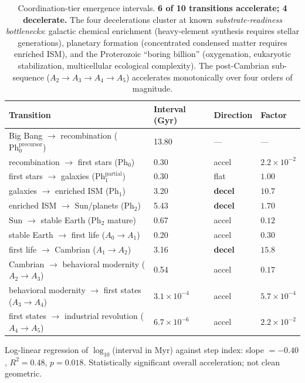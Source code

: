 \documentclass[11pt,a4paper]{article}
\newcommand{\Phys}{\mathrm{Ph}}
\begin{document}
\begin{table}[h]
\centering
\small
\begin{tabular}{p{4.8cm}p{2.0cm}p{1.5cm}p{1.5cm}}
\toprule
\textbf{Transition} & \textbf{Interval (Gyr)} & \textbf{Direction} & \textbf{Factor} \\
\midrule
Big Bang $\to$ recombination ($\Phys_0^{\text{precursor}}$) & 13.80 & --- & --- \\
recombination $\to$ first stars ($\Phys_0$) & 0.30 & accel & $2.2 \times 10^{-2}$ \\
first stars $\to$ galaxies ($\Phys_1^{\text{partial}}$) & 0.30 & flat & $1.00$ \\
galaxies $\to$ enriched ISM ($\Phys_1$) & 3.20 & \textbf{decel} & $10.7$ \\
enriched ISM $\to$ Sun/planets ($\Phys_2$) & 5.43 & \textbf{decel} & $1.70$ \\
Sun $\to$ stable Earth ($\Phys_2$ mature) & 0.67 & accel & $0.12$ \\
stable Earth $\to$ first life ($A_0 \to A_1$) & 0.20 & accel & $0.30$ \\
first life $\to$ Cambrian ($A_1 \to A_2$) & 3.16 & \textbf{decel} & $15.8$ \\
Cambrian $\to$ behavioral modernity ($A_2 \to A_3$) & 0.54 & accel & $0.17$ \\
behavioral modernity $\to$ first states ($A_3 \to A_4$) & $3.1 \times 10^{-4}$ & accel & $5.7 \times 10^{-4}$ \\
first states $\to$ industrial revolution ($A_4 \to A_5$) & $6.7 \times 10^{-6}$ & accel & $2.2 \times 10^{-2}$ \\
\bottomrule
\end{tabular}
\caption{Coordination-tier emergence intervals. \textbf{6 of 10 transitions accelerate; 4 decelerate.} The four decelerations cluster at known \emph{substrate-readiness bottlenecks}: galactic chemical enrichment (heavy-element synthesis requires stellar generations), planetary formation (concentrated condensed matter requires enriched ISM), and the Proterozoic ``boring billion'' (oxygenation, eukaryotic stabilization, multicellular ecological complexity). The post-Cambrian sub-sequence ($A_2 \to A_3 \to A_4 \to A_5$) accelerates monotonically over four orders of magnitude.}
\label{tab:rung-emergence}
\end{table}

Log-linear regression of $\log_{10}$(interval in Myr) against step index: slope $= -0.40$, $R^2 = 0.48$, $p = 0.018$. Statistically significant overall acceleration; not clean geometric.
\end{document}
